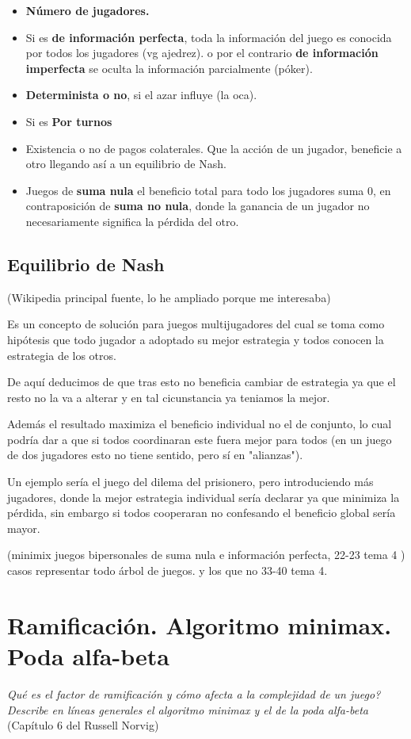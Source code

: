 \documentclass[12 pt, a4paper]{article}
\begin{document}
\begin{itemize}
  \item \textbf{Número de jugadores.}
  \item Si es \textbf{de información perfecta}, toda la información del juego es conocida por todos los jugadores (vg ajedrez). 
  o por el contrario \textbf{ de información imperfecta} se oculta la información parcialmente (póker).
  \item \textbf{Determinista o no}, si el azar influye (la oca).
  \item  Si es \textbf{Por turnos}
  \item Existencia o no de pagos colaterales. Que la acción de un jugador, beneficie a otro llegando así a un equilibrio de Nash. 
  \item Juegos de \textbf{suma nula} el beneficio total para todo los jugadores suma 0, en contraposición de \textbf{suma no nula}, 
  donde la ganancia de un jugador no necesariamente significa la pérdida del otro.  
\end{itemize}

\subsection{Equilibrio de Nash}
(Wikipedia principal fuente, lo he ampliado porque me interesaba)

Es un concepto de solución para juegos multijugadores del cual se toma como hipótesis 
que todo jugador a adoptado su mejor estrategia y todos conocen la estrategia de los otros.

De aquí deducimos de que tras esto no beneficia cambiar de estrategia ya que el resto no la va a alterar
y en tal cicunstancia ya teniamos la mejor. 

Además el resultado maximiza el beneficio individual no el de conjunto, lo cual podría dar a que 
si todos coordinaran este fuera mejor para todos (en un juego de dos jugadores esto no tiene sentido, pero sí en "alianzas"). 


Un ejemplo sería el juego del dilema del prisionero, pero introduciendo más jugadores, 
donde la mejor estrategia individual sería declarar ya que minimiza la pérdida, sin embargo 
si todos cooperaran no confesando el beneficio global sería mayor. 

\newpage

(minimix juegos bipersonales de suma nula e información perfecta, 22-23 tema 4 ) casos representar 
todo árbol de juegos. y los que no 33-40 tema 4. 
\section{Ramificación. Algoritmo minimax. Poda alfa-beta}
\textit{Qué es el factor de ramificación y cómo afecta a la complejidad de un juego? Describe en líneas generales el algoritmo minimax y el de la poda alfa-beta }
(Capítulo 6 del Russell Norvig)
\end{document}
